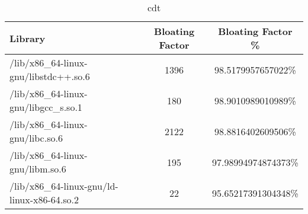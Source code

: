 \begin{table}[h]

\centering
\caption{cdt}
\footnotesize
\begin{tabular}{l|c|c}
\toprule
Library & Bloating Factor & Bloating Factor \% \\ \midrule
\colorbox{gray!20}{/lib/x86\_64-linux-gnu/libstdc++.so.6} & 1396 & 98.5179957657022\% \\ \hline
\colorbox{gray!20}{/lib/x86\_64-linux-gnu/libgcc\_s.so.1} & 180 & 98.9010989010989\% \\ \hline
\colorbox{gray!20}{/lib/x86\_64-linux-gnu/libc.so.6} & 2122 & 98.8816402609506\% \\ \hline
\colorbox{gray!20}{/lib/x86\_64-linux-gnu/libm.so.6} & 195 & 97.98994974874373\% \\ \hline
/lib/x86\_64-linux-gnu/ld-linux-x86-64.so.2 & 22 & 95.65217391304348\% \\ \hline
\bottomrule
\end{tabular}
\end{table}

